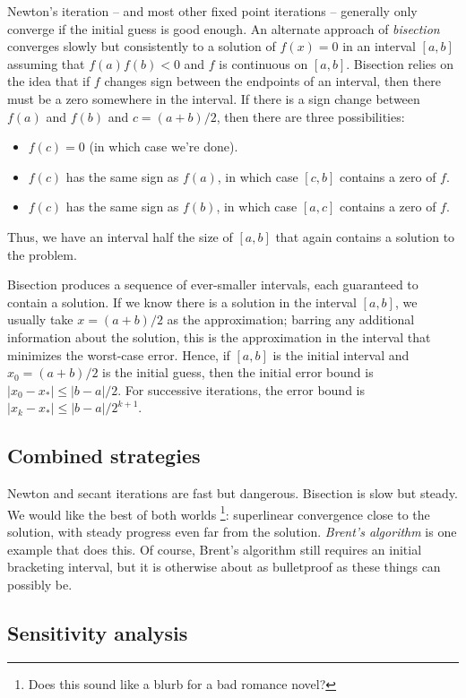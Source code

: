 \documentclass[12pt, leqno]{article}
\begin{document}
Newton's iteration -- and most other fixed point iterations --
generally only converge if the initial guess is good enough.  An
alternate approach of {\em bisection} converges slowly but
consistently to a solution of $f(x) = 0$ in an interval $[a,b]$
assuming that $f(a) f(b) < 0$ and $f$ is continuous on $[a,b]$.
Bisection relies on the idea that if $f$ changes sign between
the endpoints of an interval, then there must be a zero somewhere
in the interval.  If there is a sign change between $f(a)$ and $f(b)$
and $c = (a+b)/2$, then there are three possibilities:
\begin{itemize}
\item $f(c) = 0$ (in which case we're done).
\item $f(c)$ has the same sign as $f(a)$, in which case $[c,b]$
  contains a zero of $f$.
\item $f(c)$ has the same sign as $f(b)$, in which case $[a,c]$
  contains a zero of $f$.
\end{itemize}
Thus, we have an interval half the size of $[a,b]$ that again
contains a solution to the problem.

Bisection produces a sequence of ever-smaller intervals, each
guaranteed to contain a solution.  If we know there is a solution
in the interval $[a,b]$, we usually take $x = (a+b)/2$ as the
approximation; barring any additional information about the solution,
this is the approximation in the interval that minimizes the
worst-case error.  Hence, if $[a,b]$ is the initial interval and
$x_0 = (a+b)/2$ is the initial guess, then the initial error bound is
$|x_0-x_*| \leq |b-a|/2$.  For successive iterations, the error bound
is $|x_k-x_*| \leq |b-a|/2^{k+1}$.

\subsection{Combined strategies}

Newton and secant iterations are fast but dangerous.  Bisection is
slow but steady.  We would like the best of both worlds%
\footnote{Does this sound like a blurb for a bad romance novel?}:
superlinear convergence close to the solution, with steady progress
even far from the solution.  {\em Brent's algorithm} is one example
that does this.  Of course, Brent's algorithm
still requires an initial bracketing interval, but it is otherwise
about as bulletproof as these things can possibly be.

\subsection{Sensitivity analysis}
\end{document}
